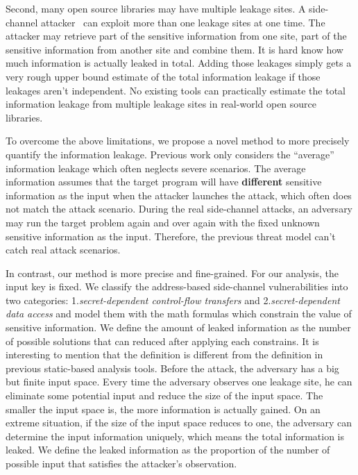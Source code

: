 Second, many open source libraries may have multiple leakage sites. 
A side-channel attacker~\cite{191010,7163052,hornby2011side} can exploit more than one leakage 
sites at one time. 
The attacker may retrieve part of the sensitive information from one site, part of the sensitive
information from another site and combine them.
It is hard know how much information is actually leaked in total. Adding those leakages 
simply gets a very rough upper bound estimate of the total information leakage if those 
leakages aren’t independent. No existing tools can practically estimate the total information 
leakage from multiple leakage sites in real-world open source libraries.

To overcome the above limitations, we propose a novel method
to more precisely quantify the information leakage. Previous work only considers the
``average'' information leakage which often neglects severe scenarios.
The average information assumes that the target program will have \textbf{different} sensitive 
information as the input when the attacker launches the attack,
which often does not match the attack scenario. During the real side-channel
attacks, an adversary may run the target problem again and over again with the 
fixed unknown sensitive information as the input. Therefore, the previous
threat model can't catch real attack scenarios.

In contrast, our method is more precise and fine-grained. 
For our analysis, the input key is fixed. We classify the address-based side-channel 
vulnerabilities into two categories: 1.\textit{secret-dependent control-flow transfers} 
and 2.\textit{secret-dependent data access} and model them with the math formulas which
constrain the value of sensitive information.
We define the amount of leaked information as the number of possible solutions that can
reduced after applying each constrains.
It is interesting to mention that the definition is different from the 
definition in previous static-based analysis tools. 
Before the attack, the adversary has a big but finite input space.
Every time the adversary observes one leakage site, he can eliminate some potential input and
reduce the size of the input space. The smaller the input space is, the more information is 
actually gained. On an extreme situation, if the size of the input space reduces to one, the
adversary can determine the input information uniquely, which means the total information is 
leaked. We define the leaked information as the proportion of the number of possible input 
that satisfies the attacker's observation.

